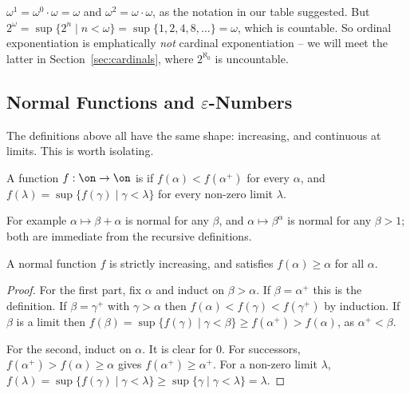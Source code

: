 \begin{example}
  $\omega^1 = \omega^0 \cdot \omega = \omega$ and $\omega^2 = \omega \cdot \omega$, as the notation in our table suggested. But $2^\omega = \sup\{2^n \mid n < \omega\} = \sup\{1, 2, 4, 8, \dots\} = \omega$, which is countable. So ordinal exponentiation is emphatically \emph{not} cardinal exponentiation -- we will meet the latter in Section~\ref{sec:cardinals}, where $2^{\aleph_0}$ is uncountable.
\end{example}

\subsection{Normal Functions and \texorpdfstring{$\varepsilon$}{epsilon}-Numbers}

The definitions above all have the same shape: increasing, and continuous at limits. This is worth isolating.

\begin{definition}
  A function $f: \on \to \on$ is  if $f(\alpha) < f(\alpha^+)$ for every $\alpha$, and $f(\lambda) = \sup\{f(\gamma) \mid \gamma < \lambda\}$ for every non-zero limit $\lambda$.
\end{definition}

For example $\alpha \mapsto \beta + \alpha$ is normal for any $\beta$, and $\alpha \mapsto \beta^\alpha$ is normal for any $\beta > 1$; both are immediate from the recursive definitions.

\begin{lemma}\label{lem:normalinc}
  A normal function $f$ is strictly increasing, and satisfies $f(\alpha) \geq \alpha$ for all $\alpha$.
\end{lemma}
\begin{proof}
  For the first part, fix $\alpha$ and induct on $\beta > \alpha$. If $\beta = \alpha^+$ this is the definition. If $\beta = \gamma^+$ with $\gamma > \alpha$ then $f(\alpha) < f(\gamma) < f(\gamma^+)$ by induction. If $\beta$ is a limit then $f(\beta) = \sup\{f(\gamma) \mid \gamma < \beta\} \geq f(\alpha^+) > f(\alpha)$, as $\alpha^+ < \beta$.

  For the second, induct on $\alpha$. It is clear for $0$. For successors, $f(\alpha^+) > f(\alpha) \geq \alpha$ gives $f(\alpha^+) \geq \alpha^+$. For a non-zero limit $\lambda$, $f(\lambda) = \sup\{f(\gamma) \mid \gamma < \lambda\} \geq \sup\{\gamma \mid \gamma < \lambda\} = \lambda$.
\end{proof}

